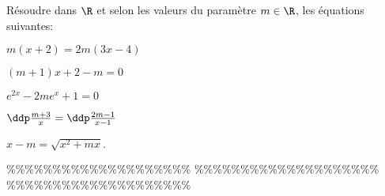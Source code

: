 



\begin{exercice} 
R\'esoudre dans $\R$ et selon les valeurs du param\`etre $m\in\R$, les \'equations suivantes:
\begin{enumerate}
\begin{minipage}[t]{0.45\textwidth}
\item $m(x+2)=2m(3x-4)$
\item $(m+1)x+2-m=0$
\item $e^{2x}-2me^x+1=0$
\end{minipage}
\begin{minipage}[t]{0.45\textwidth}
\item $\ddp\frac{m+3}{x}=\ddp\frac{2m-1}{x-1}$
\item $x-m=\sqrt{x^2+mx}.$
\end{minipage}
\end{enumerate}
\end{exercice}


\%\%\%\%\%\%\%\%\%\%\%\%\%\%\%\%\%\%\%\%
\%\%\%\%\%\%\%\%\%\%\%\%\%\%\%\%\%\%\%\%
\%\%\%\%\%\%\%\%\%\%\%\%\%\%\%\%\%\%\%\%




